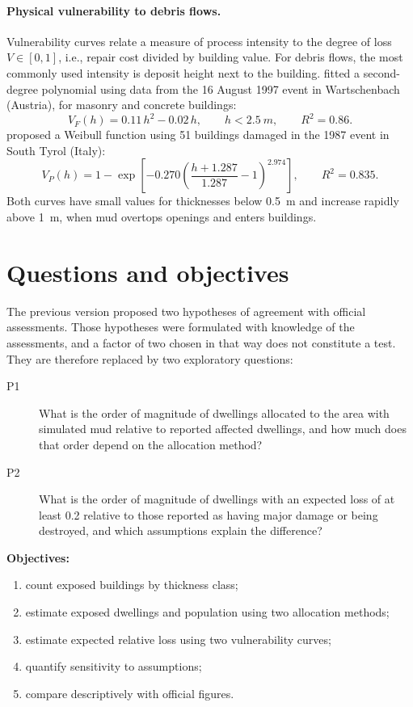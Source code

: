\documentclass[10pt,a4paper]{article}
\begin{document}
\paragraph{Physical vulnerability to debris flows.} Vulnerability curves relate a measure of process intensity to the degree of loss $V\in[0,1]$, i.e., repair cost divided by building value. For debris flows, the most commonly used intensity is deposit height next to the building. \citet{fuchs2007} fitted a second-degree polynomial using data from the 16 August 1997 event in Wartschenbach (Austria), for masonry and concrete buildings:
\begin{equation}
V_F(h)=0.11\,h^2-0.02\,h,\qquad h<\SI{2.5}{m},\qquad R^2=0.86. \label{eq:fuchs}
\end{equation}
\citet{papathoma2012} proposed a Weibull function using 51 buildings damaged in the 1987 event in South Tyrol (Italy):
\begin{equation}
V_P(h)=1-\exp\!\left[-0.270\left(\frac{h+1.287}{1.287}-1\right)^{2.974}\right],\qquad R^2=0.835. \label{eq:pk}
\end{equation}
Both curves have small values for thicknesses below \SI{0.5}{m} and increase rapidly above \SI{1}{m}, when mud overtops openings and enters buildings.

\section{Questions and objectives}
The previous version proposed two hypotheses of agreement with official assessments. Those hypotheses were formulated with knowledge of the assessments, and a factor of two chosen in that way does not constitute a test. They are therefore replaced by two exploratory questions:
\begin{description}
\item[P1] What is the order of magnitude of dwellings allocated to the area with simulated mud relative to reported affected dwellings, and how much does that order depend on the allocation method?
\item[P2] What is the order of magnitude of dwellings with an expected loss of at least 0.2 relative to those reported as having major damage or being destroyed, and which assumptions explain the difference?
\end{description}
\noindent\textbf{Objectives:}
\begin{enumerate}
\item count exposed buildings by thickness class;
\item estimate exposed dwellings and population using two allocation methods;
\item estimate expected relative loss using two vulnerability curves;
\item quantify sensitivity to assumptions;
\item compare descriptively with official figures.
\end{enumerate}
\end{document}
